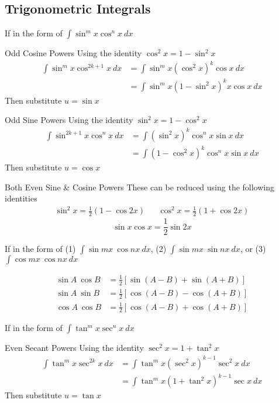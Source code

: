 \documentclass{template}
\begin{document}
\subsection{Trigonometric Integrals}
If in the form of $\displaystyle\int \sin^m x\cos^n x \ dx$
\begin{mdframed_title}{Odd Cosine Powers}
    Using the identity $\cos^2 x = 1 - \sin^2 x$
    \begin{align*}
        \int \sin^m x\cos^{2k+1} x \ dx &= \int \sin^m x(\cos^2 x)^k \cos{x} \ dx \\
        &= \int \sin^m x(1-\sin^2 x)^k x \cos{x} \ dx 
    \end{align*}
    Then substitute $u = \sin{x}$
\end{mdframed_title}
\begin{mdframed_title}{Odd Sine Powers}
    Using the identity $\sin^2 x = 1 - \cos^2 x$
    \begin{align*}
        \int \sin^{2k+1} x\cos^n x \ dx &= \int (\sin^2 x)^k \cos^n x \sin{x} \ dx \\
        &= \int (1-\cos^2 x)^k \cos^n x \sin{x} \ dx 
    \end{align*}
    Then substitute $u = \cos{x}$
\end{mdframed_title}
\begin{mdframed_title}{Both Even Sine \& Cosine Powers}
    These can be reduced using the following identities
    \begin{align*}
        \sin^2 x = \frac{1}{2}(1 - \cos 2x) && \cos^2 x = \frac{1}{2}(1 + \cos 2x)
    \end{align*}
    $$\sin x \cos x = \frac{1}{2} \sin 2x$$
\end{mdframed_title}

If in the form of (1) $\displaystyle\int \sin mx \ \cos nx \ dx$, (2) $\displaystyle\int \sin mx \ \sin nx \ dx$, or (3) $\displaystyle\int \cos mx \ \cos nx \ dx$

\begin{mdframed}
    \begin{align}
        \sin A \ \cos B &= \frac{1}{2} [\sin(A-B)+\sin(A+B)] \\
        \sin A \ \sin B &= \frac{1}{2} [\cos(A-B)-\cos(A+B)] \\
        \cos A \ \cos B &= \frac{1}{2} [\cos(A-B)+\cos(A+B)]
    \end{align}
\end{mdframed}

\newpage
If in the form of $\displaystyle\int \tan^m x\sec^n x \ dx$
\begin{mdframed_title}{Even Secant Powers}
    Using the identity $\sec^2 x = 1 + \tan^2 x$
    \begin{align*}
        \int \tan^m x\sec^{2k} x \ dx &= \int \tan^m x(\sec^2 x)^{k-1} \sec^2 x \ dx \\
        &= \int \tan^m x(1+\tan^2 x)^{k-1} \sec{x} \ dx 
    \end{align*}
    Then substitute $u = \tan{x}$
\end{mdframed_title}
\end{document}
